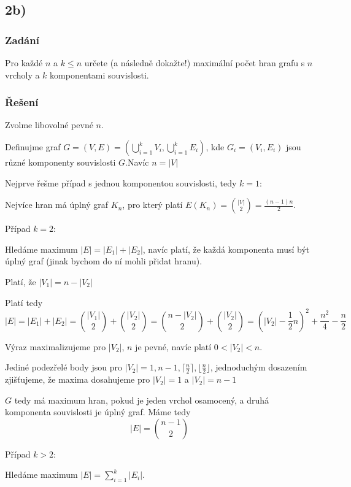 \documentclass[../main.tex]{subfiles}
\begin{document}
\subsection{2b)}
\subsubsection*{Zadání}
Pro každé $n$ a $k\leq n$ určete (a následně dokažte!) maximální počet hran grafu
s $n$ vrcholy a $k$ komponentami souvislosti.


\subsubsection*{Řešení}

Zvolme libovolné pevné $n$.

Definujme graf  $G= (V,E) =( \bigcup_{i=1}^k V_i  ,\bigcup_{i=1}^k E_i )$, kde $G_i = (V_i, E_i)$ jsou různé komponenty souvislosti $G$.Navíc $n= |V|$


Nejprve řešme případ s jednou komponentou souvislosti, tedy $k=1$:

Nejvíce hran má úplný graf $K_n$, pro který platí $E(K_n) = \binom{|V|}{2} = \frac{(n - 1)n}{2}$.

Případ $k=2$:

Hledáme maximum $|E| = |E_1| + |E_2|$, navíc platí, že každá komponenta musí být úplný graf (jinak bychom do ní mohli přidat hranu).

Platí, že $|V_1| =  n -|V_2|$

Platí tedy 
\begin{equation*}
    |E| = |E_1| + |E_2| = \binom{|V_1|}{2} + \binom{|V_2|}{2} =  \binom{n -|V_2|}{2} + \binom{|V_2|}{2} = 
    (|V_2| - \frac{1}{2}n)^2 + \frac{n^2}{4} -\frac{n}{2}
\end{equation*}

Výraz maximalizujeme pro $|V_2|$, $n$ je pevné, navíc platí $0 < |V_2| <n$.

Jediné podezřelé body jsou pro $|V_2| = 1, n-1, \lceil\frac{n}{2}\rceil, \lfloor\frac{n}{2}\rfloor$, jednoduchým dosazením zjišťujeme, že maxima dosahujeme pro $|V_2| = 1$ a $|V_2| = n - 1$

$G$ tedy má maximum hran, pokud je jeden vrchol osamocený, a druhá komponenta souvislosti je úplný graf.   Máme tedy
\begin{equation*}
    |E| = \binom{n - 1}{2}
\end{equation*}

Případ $k>2$:

Hledáme maximum $|E| = \sum_{i=1}^k|E_i|$.
\end{document}
